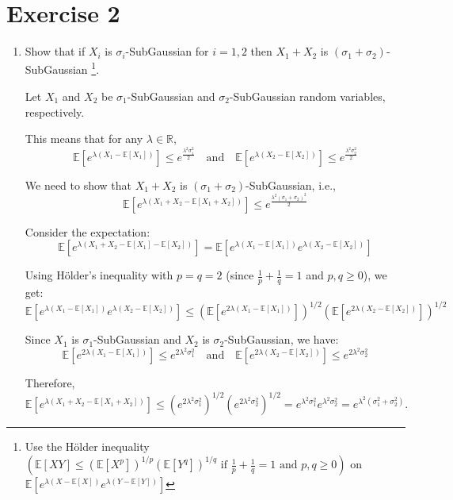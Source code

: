 \documentclass[a4 paper]{article}
\theoremstyle{boldStyle}
\theoremstyle{boldBlueStyle}
\theoremstyle{boldPurpleStyle}
\theoremstyle{boldRedStyle}
\begin{document}
\newpage
\section*{Exercise 2}
\begin{enumerate}
\item \textcolor{blueColor}{
  Show that if \(X_i\) is \(\sigma_i\)-SubGaussian for \(i = 1, 2\) then \(X_1 + X_2\) is \((\sigma_1 + \sigma_2)\)-SubGaussian
\footnote{Use the Hölder inequality \((\mathbb{E}[XY] \leq (\mathbb{E}[X^p])^{1/p} (\mathbb{E}[Y^q])^{1/q} \text{ if } \frac{1}{p} + \frac{1}{q} = 1 \text{ and } p, q \geq 0)\) 
on \(\mathbb{E}[e^{\lambda (X - \mathbb{E}[X])} e^{\lambda (Y - \mathbb{E}[Y])}]\)}.} 

Let \(X_1\) and \(X_2\) be \(\sigma_1\)-SubGaussian and \(\sigma_2\)-SubGaussian random variables, respectively. 

This means that for any \(\lambda \in \mathbb{R}\),
\[
\mathbb{E}\left[e^{\lambda (X_1 - \mathbb{E}[X_1])}\right] \leq e^{\frac{\lambda^2 \sigma_1^2}{2}} \quad \text{and} 
\quad \mathbb{E}\left[e^{\lambda (X_2 - \mathbb{E}[X_2])}\right] \leq e^{\frac{\lambda^2 \sigma_2^2}{2}}
\]

We need to show that \(X_1 + X_2\) is \((\sigma_1 + \sigma_2)\)-SubGaussian, i.e.,
\[
\mathbb{E}\left[e^{\lambda (X_1 + X_2 - \mathbb{E}[X_1 + X_2])}\right] \leq e^{\frac{\lambda^2 (\sigma_1 + \sigma_2)^2}{2}}
\]

Consider the expectation:
\[
\mathbb{E}\left[e^{\lambda (X_1 + X_2 - \mathbb{E}[X_1] - \mathbb{E}[X_2])}\right] = \mathbb{E}\left[e^{\lambda (X_1 - \mathbb{E}[X_1])} e^{\lambda (X_2 - \mathbb{E}[X_2])}\right]
\]

Using Hölder's inequality with \(p = q = 2\) (since \(\frac{1}{p} + \frac{1}{q} = 1\) and \(p, q \geq 0\)), we get:
\[
\mathbb{E}\left[e^{\lambda (X_1 - \mathbb{E}[X_1])} e^{\lambda (X_2 - \mathbb{E}[X_2])}\right] \leq 
\left(\mathbb{E}\left[e^{2\lambda (X_1 - \mathbb{E}[X_1])}\right]\right)^{1/2} \left(\mathbb{E}\left[e^{2\lambda (X_2 - \mathbb{E}[X_2])}\right]\right)^{1/2}
\]

Since \(X_1\) is \(\sigma_1\)-SubGaussian and \(X_2\) is \(\sigma_2\)-SubGaussian, we have:
\[
\mathbb{E}\left[e^{2\lambda (X_1 - \mathbb{E}[X_1])}\right] \leq e^{2\lambda^2 \sigma_1^2} \quad \text{and} 
\quad \mathbb{E}\left[e^{2\lambda (X_2 - \mathbb{E}[X_2])}\right] \leq e^{2\lambda^2 \sigma_2^2}
\]

Therefore,
\[
\mathbb{E}\left[e^{\lambda (X_1 + X_2 - \mathbb{E}[X_1 + X_2])}\right] \leq \left(e^{2\lambda^2 \sigma_1^2}\right)^{1/2} \left(e^{2\lambda^2 \sigma_2^2}\right)^{1/2} = e^{\lambda^2 \sigma_1^2} e^{\lambda^2 \sigma_2^2} = e^{\lambda^2 (\sigma_1^2 + \sigma_2^2)}.
\]


\end{enumerate}
\end{document}
